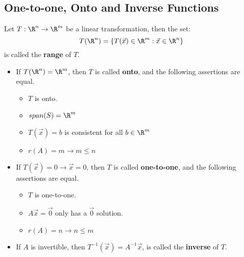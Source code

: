 \documentclass[a4paper]{article}
\begin{document}
  \subsection{One-to-one, Onto and Inverse Functions}
  Let $T: \R^n \rightarrow \R^m$ be a linear transformation, then the set:
  \[
    T(\R^n) = \{T(\vec{x}) \in \R^m : \vec{x} \in \R^n\}
  \]
  is called the \textbf{range} of $T$.
  \begin{itemize}
    \item If $T(\R^n) = \R^m$, then $T$ is called \textbf{onto}, and the following assertions are equal.
      \begin{itemize}
        \item $T$ is onto.
        \item $span (S) = \R^m$
        \item $T(\vec{x}) = b$ is consistent for all $ b \in \R^m$
        \item $r(A) = m \rightarrow m \leq n$
      \end{itemize}
    \item If $T(\vec{x}) = 0 \rightarrow \vec{x} = 0$, then $T$ is called \textbf{one-to-one}, and the following assertions are equal.
      \begin{itemize}
        \item $T$ is one-to-one.
        \item $A\vec{x} = \vec{0}$ only has a $\vec{0}$ solution.
        \item $r(A) = n \rightarrow n \leq m$
      \end{itemize}
    \item If $A$ is invertible, then $T^{-1}(\vec{x}) = A^{-1} \vec{x}$, is called the \textbf{inverse} of $T$.
  \end{itemize}
\end{document}
